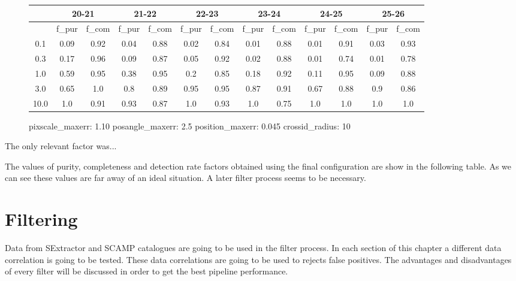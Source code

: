 \documentclass{article}
\begin{document}
\begin{figure}[H]
\centering
\begin{tabular}{|c|c|c|c|c|c|c|c|c|c|c|c|c|}
\hline
\multicolumn{1}{|c|}{} & \multicolumn{2}{|c|}{20-21} & \multicolumn{2}{|c|}{21-22} & \multicolumn{2}{|c|}{22-23} & \multicolumn{2}{|c|}{23-24} & \multicolumn{2}{|c|}{24-25} & \multicolumn{2}{|c|}{25-26}\\
\hline \hline
 & f\_pur & f\_com & f\_pur & f\_com & f\_pur & f\_com & f\_pur & f\_com & f\_pur & f\_com & f\_pur & f\_com \\
\hline
0.1 & 0.09 & 0.92 & 0.04 & 0.88 & 0.02 & 0.84 & 0.01 & 0.88 & 0.01 & 0.91 & 0.03 & 0.93\\
\hline
0.3 & 0.17 & 0.96 & 0.09 & 0.87 & 0.05 & 0.92 & 0.02 & 0.88 & 0.01 & 0.74 & 0.01 & 0.78\\
\hline
1.0 & 0.59 & 0.95 & 0.38 & 0.95 & 0.2 & 0.85 & 0.18 & 0.92 & 0.11 & 0.95 & 0.09 & 0.88\\
\hline
3.0 & 0.65 & 1.0 & 0.8 & 0.89 & 0.95 & 0.95 & 0.87 & 0.91 & 0.67 & 0.88 & 0.9 & 0.86\\
\hline
10.0 & 1.0 & 0.91 & 0.93 & 0.87 & 1.0 & 0.93 & 1.0 & 0.75 & 1.0 & 1.0 & 1.0 & 1.0\\
\hline
\end{tabular}
\caption{pixscale\_maxerr: 1.10 posangle\_maxerr: 2.5 position\_maxerr: 0.045 crossid\_radius: 10}
\end{figure}

\par The only relevant factor was...

\par The values of purity, completeness and detection rate factors obtained using the final configuration are show in the following table. As we can see these values are far away of an ideal situation. A later filter process seems to be necessary. 

\section{Filtering}
Data from SExtractor and SCAMP catalogues are going to be used in the filter process. In each section of this chapter a different data correlation is going to be tested. These data correlations are going to be used to rejects false positives. The advantages and disadvantages of every filter will be discussed in order to get the best pipeline performance. 
\end{document}
